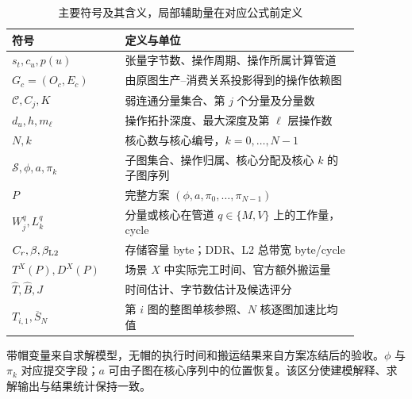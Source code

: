 \begin{table}[htbp]
\centering
\caption{主要符号及其含义，局部辅助量在对应公式前定义}
\label{tab:notation}
\begin{tabular}{p{0.28\linewidth}p{0.59\linewidth}}
\hline
符号 & 定义与单位 \\
\hline
$s_t,c_u,p(u)$ & 张量字节数、操作周期、操作所属计算管道 \\
$G_c=(O_c,E_c)$ & 由原图生产--消费关系投影得到的操作依赖图 \\
$\mathcal C,C_j,K$ & 弱连通分量集合、第 $j$ 个分量及分量数 \\
$d_u,h,m_\ell$ & 操作拓扑深度、最大深度及第 $\ell$ 层操作数 \\
$N,k$ & 核心数与核心编号，$k=0,\ldots,N-1$ \\
$\mathcal S,\phi,a,\pi_k$ & 子图集合、操作归属、核心分配及核心 $k$ 的子图序列 \\
$P$ & 完整方案 $(\phi,a,\pi_0,\ldots,\pi_{N-1})$ \\
$W_j^q,L_k^q$ & 分量或核心在管道 $q\in\{M,V\}$ 上的工作量，cycle \\
$C_r,\beta,\beta_{\rm L2}$ & 存储容量 byte；DDR、L2 总带宽 byte/cycle \\
$T^{X}(P),D^{X}(P)$ & 场景 $X$ 中实际完工时间、官方额外搬运量 \\
$\widehat T,\widehat B,J$ & 时间估计、字节数估计及候选评分 \\
$T_{i,1},\overline S_N$ & 第 $i$ 图的整图单核参照、$N$ 核逐图加速比均值 \\
\hline
\end{tabular}
\end{table}

带帽变量来自求解模型，无帽的执行时间和搬运结果来自方案冻结后的验收。$\phi$ 与 $\pi_k$ 对应提交字段；$a$ 可由子图在核心序列中的位置恢复。该区分使建模解释、求解输出与结果统计保持一致。
